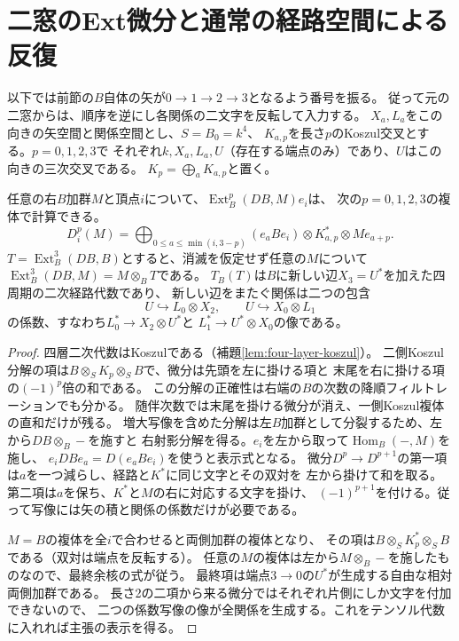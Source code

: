 \section{二窓のExt微分と通常の経路空間による反復}
\label{sec:two-window-ext}
以下では前節の$B$自体の矢が$0\to1\to2\to3$となるよう番号を振る。
従って元の二窓からは、順序を逆にし各関係の二文字を反転して入力する。
$X_a,L_a$をこの向きの矢空間と関係空間とし、$S=B_0=k^4$、
$K_{a,p}$を長さ$p$のKoszul交叉とする。$p=0,1,2,3$で
それぞれ$k,X_a,L_a,U$（存在する端点のみ）であり、$U$はこの向きの三次交叉である。
$K_p=\bigoplus_a K_{a,p}$と置く。

\begin{proposition}[四項の計算と新しい辺の表示]\label{prop:two-window-ext-complex}
任意の右$B$加群$M$と頂点$i$について、$\operatorname{Ext}_B^p(DB,M)e_i$は、
次の$p=0,1,2,3$の複体で計算できる。
\[
 D_i^p(M)=\bigoplus_{0\le a\le\min(i,3-p)}
 (e_aBe_i)\otimes K_{a,p}^*\otimes M e_{a+p}.
\]
$T=\operatorname{Ext}_B^3(DB,B)$とすると、消滅を仮定せず任意の$M$について
$\operatorname{Ext}_B^3(DB,M)=M\otimes_B T$である。
$T_B(T)$は$B$に新しい辺$X_3=U^*$を加えた四周期の二次経路代数であり、
新しい辺をまたぐ関係は二つの包含
\[
 U\hookrightarrow L_0\otimes X_2,\qquad U\hookrightarrow X_0\otimes L_1
\]
の係数、すなわち$L_0^*\to X_2\otimes U^*$と
$L_1^*\to U^*\otimes X_0$の像である。
\end{proposition}
\begin{proof}
四層二次代数はKoszulである（補題\ref{lem:four-layer-koszul}）。
二側Koszul分解の項は$B\otimes_S K_p\otimes_S B$で、微分は先頭を左に掛ける項と
末尾を右に掛ける項の$(-1)^p$倍の和である。
この分解の正確性は右端の$B$の次数の降順フィルトレーションでも分かる。
随伴次数では末尾を掛ける微分が消え、一側Koszul複体の直和だけが残る。
増大写像を含めた分解は左$B$加群として分裂するため、左から$DB\otimes_B-$を施すと
右射影分解を得る。$e_i$を左から取って$\operatorname{Hom}_B(-,M)$を施し、
$e_i DB e_a=D(e_aBe_i)$を使うと表示式となる。
微分$D^p\to D^{p+1}$の第一項は$a$を一つ減らし、経路と$K^*$に同じ文字とその双対を
左から掛けて和を取る。第二項は$a$を保ち、$K^*$と$M$の右に対応する文字を掛け、
$(-1)^{p+1}$を付ける。従って写像には矢の積と関係の係数だけが必要である。

$M=B$の複体を全$i$で合わせると両側加群の複体となり、
その項は$B\otimes_S K_p^*\otimes_S B$である（双対は端点を反転する）。
任意の$M$の複体は左から$M\otimes_B-$を施したものなので、最終余核の式が従う。
最終項は端点$3\to0$の$U^*$が生成する自由な相対両側加群である。
長さ2の二項から来る微分ではそれぞれ片側にしか文字を付加できないので、
二つの係数写像の像が全関係を生成する。これをテンソル代数に入れれば主張の表示を得る。
\end{proof}

